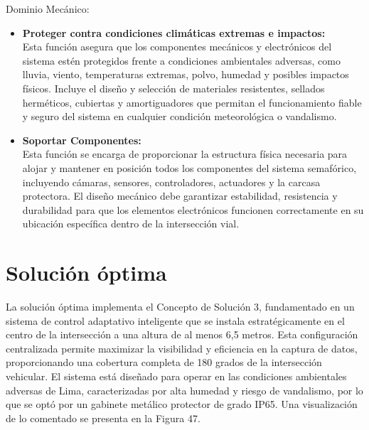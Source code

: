 \documentclass[12pt,a4paper,oneside]{report}
\begin{document}
Dominio Mecánico:

\begin{itemize}
\item
  \textbf{Proteger contra condiciones climáticas extremas e impactos:}\\
  Esta función asegura que los componentes mecánicos y electrónicos del sistema estén protegidos frente a condiciones ambientales adversas, como lluvia, viento, temperaturas extremas, polvo, humedad y posibles impactos físicos. Incluye el diseño y selección de materiales resistentes, sellados herméticos, cubiertas y amortiguadores que permitan el funcionamiento fiable y seguro del sistema en cualquier condición meteorológica o vandalismo.
\item
  \textbf{Soportar Componentes:}\\
  Esta función se encarga de proporcionar la estructura física necesaria para alojar y mantener en posición todos los componentes del sistema semafórico, incluyendo cámaras, sensores, controladores, actuadores y la carcasa protectora. El diseño mecánico debe garantizar estabilidad, resistencia y durabilidad para que los elementos electrónicos funcionen correctamente en su ubicación específica dentro de la intersección vial.
\end{itemize}

\section{Solución óptima}\label{soluciuxf3n-uxf3ptima}

La solución óptima implementa el Concepto de Solución 3, fundamentado en un sistema de control adaptativo inteligente que se instala estratégicamente en el centro de la intersección a una altura de al menos 6,5 metros. Esta configuración centralizada permite maximizar la visibilidad y eficiencia en la captura de datos, proporcionando una cobertura completa de 180 grados de la intersección vehicular. El sistema está diseñado para operar en las condiciones ambientales adversas de Lima, caracterizadas por alta humedad y riesgo de vandalismo, por lo que se optó por un gabinete metálico protector de grado IP65. Una visualización de lo comentado se presenta en la Figura 47.
\end{document}
